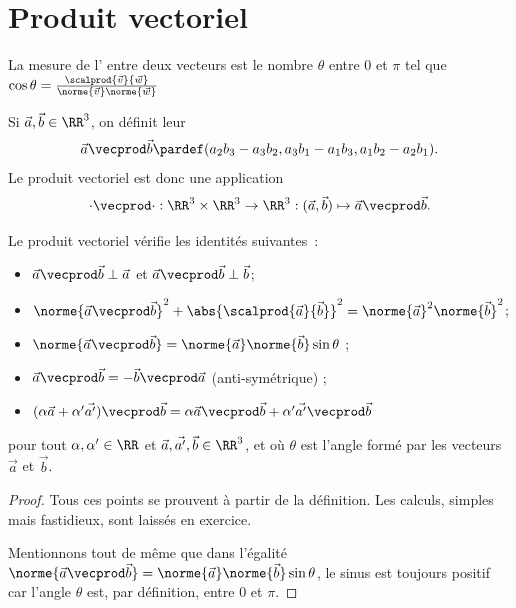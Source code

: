 \documentclass[french,xcolor=svgnames]{beamer}
\begin{document}
\section{Produit vectoriel}
\begin{frame}
  \begin{definition}
    La mesure de l' entre deux vecteurs est le nombre \(\theta\) entre \(0\) et \(\pi\) tel que
    \(\cos \theta = \frac{\scalprod{\vec{v}}{\vec{w}}}{\norme{\vec{v}}\norme{\vec{w}}}\)
  \end{definition}
\end{frame}
\begin{frame}
  \label{sec:produit-vectoriel}
  \begin{definition}Si \(\vec a, \vec b \in \RR^{3}\), on définit leur 
    \begin{equation*}
      \vec a \vecprod \vec b \pardef (a_{2} b_{3} - a_{3} b_{2}, a_{3} b_{1} - a_{1} b_{3}, a_{1} b_{2} - a_{2} b_{1}).
    \end{equation*}\pause
    Le produit vectoriel est donc une application
    \begin{equation*}
      \cdot\vecprod\cdot : \RR^{3} \times \RR^{3} \to \RR^{3} : (\vec a, \vec b) \mapsto \vec a \vecprod \vec b.
    \end{equation*}
  \end{definition}
\end{frame}
\begin{frame}
\begin{proposition}Le produit vectoriel vérifie les identités suivantes~:
    \begin{itemize}[<+->]
    \item \(\vec a \vecprod \vec b \perp \vec a\) et \(\vec a \vecprod \vec b \perp \vec b\);
    \item \(\norme{\vec a \vecprod \vec b}^{2} + \abs{\scalprod{\vec a }{\vec b}}^{2} = \norme {\vec a}^{2} \norme{\vec b}^{2}\);
    \item \(\norme{\vec a \vecprod \vec b} = \norme {\vec a} \norme{\vec b} \sin \theta \) ;
    \item \(\vec a \vecprod \vec b = -\vec b \vecprod \vec a\) (anti-symétrique) ;
    \item \((\alpha \vec {a} + \alpha' \vec{a'}) \vecprod \vec b = \alpha {\vec a \vecprod \vec b} + \alpha' {\vec {a'} \vecprod \vec b}\)
    \end{itemize}
    pour tout \(\alpha, \alpha' \in \RR\) et \(\vec a, \vec {a'}, \vec b \in \RR^{3}\), et où \(\theta\) est l'angle formé par les vecteurs \(\vec a\) et \(\vec b\).
  \end{proposition}\pause
  \begin{proof}
    Tous ces points se prouvent à partir de la définition. Les calculs, simples mais fastidieux, sont laissés en exercice.

    Mentionnons tout de même que dans l'égalité \(\norme{\vec a \vecprod \vec b} = \norme {\vec a} \norme{\vec b} \sin \theta\), le sinus est toujours positif car l'angle \(\theta\) est, par définition, entre \(0\) et \(\pi\).
  \end{proof}
\end{frame}
\end{document}
